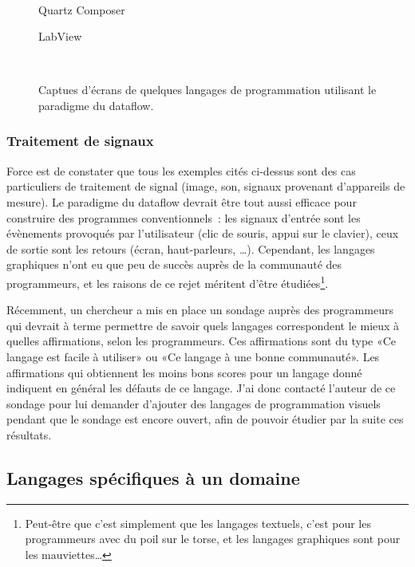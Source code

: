 \documentclass{article}
\begin{document}
\begin{figure}[ht]
  
  {\,}
  \hfill 
  \begin{minipage}{5cm}
    \centering
    \caption{Quartz Composer\cite{quartz-composer}}
    \label{fig:quartz-composer}
  \end{minipage}
  \hfill
  \begin{minipage}{5cm}
    \centering
    \caption{LabView\cite{labview}}
  \end{minipage}
  \hfill
  {\,} 
  \caption{Captues d'écrans de quelques langages de programmation utilisant le paradigme du dataflow.}
  \label{fig:screenshots}
\end{figure}

\subsubsection{Traitement de signaux}

Force est de constater que tous les exemples cités ci-dessus sont des cas particuliers de traitement de signal (image, son, signaux
provenant d'appareils de mesure). Le paradigme du dataflow devrait être tout aussi efficace pour construire des programmes conventionnels~:
les signaux d'entrée sont les évènements provoqués par l'utilisateur (clic de souris, appui sur le clavier), ceux de sortie sont les retours
(écran, haut-parleurs, \dots). Cependant, les langages graphiques n'ont eu que peu de succès auprès de la communauté des programmeurs, et
les raisons de ce rejet méritent d'être étudiées\footnote{Peut-être que c'est simplement que les langages textuels, c'est pour les
  programmeurs avec du poil sur le torse, et les langages graphiques sont pour les mauviettes…}.

Récemment, un chercheur a mis en place un sondage auprès des programmeurs qui devrait à terme permettre de savoir quels langages
correspondent le mieux à quelles affirmations, selon les programmeurs\cite{the-right-tool}. Ces affirmations sont du type «Ce langage est
facile à utiliser» ou «Ce langage à une bonne communauté». Les affirmations qui obtiennent les moins bons scores pour un langage donné
indiquent en général les défauts de ce langage. J'ai donc contacté l'auteur de ce sondage pour lui demander d'ajouter des langages de
programmation visuels pendant que le sondage est encore ouvert, afin de pouvoir étudier par la suite ces résultats.

\subsection{Langages spécifiques à un domaine}
\end{document}
